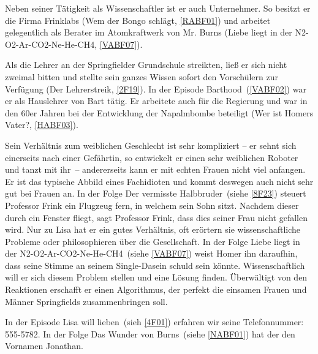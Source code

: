 {Neben seiner Tätigkeit als Wissenschaftler ist er auch Unternehmer. So besitzt er die Firma Frink\-labs (\glqq Wem der Bongo schlägt\grqq , \ref{RABF01}) und arbeitet gelegentlich als Berater im Atomkraftwerk von Mr. Burns (\glqq Liebe liegt in der N2-O2-Ar-CO2-Ne-He-CH4\grqq , \ref{VABF07}).

Als die Lehrer an der Springfielder Grundschule streikten, ließ er sich nicht zweimal bitten und stellte sein ganzes Wissen sofort den Vorschülern zur Verfügung (\glqq Der Lehrerstreik\grqq , \ref{2F19}). In der Episode \glqq Barthood\grqq\ (\ref{VABF02}) war er als Hauslehrer von Bart tätig. Er arbeitete auch für die Regierung und war in den 60er Jahren bei der Entwicklung der Napalmbombe beteiligt (\glqq Wer ist Homers Vater?\grqq, \ref{HABF03}).

Sein Verhältnis zum weiblichen Geschlecht ist sehr kompliziert -- er sehnt sich einerseits nach einer Gefährtin, so entwickelt er einen sehr weiblichen Roboter und tanzt mit \glqq ihr\grqq\ -- andererseits kann er mit echten Frauen nicht viel anfangen. Er ist das typische Abbild eines Fachidioten und kommt deswegen auch nicht sehr gut bei Frauen an. In der Folge \glqq Der vermisste Halbbruder\grqq\ (siehe \ref{8F23}) steuert Professor Frink ein Flugzeug fern, in welchem sein Sohn sitzt. Nachdem dieser durch ein Fenster fliegt, sagt Professor Frink, dass dies seiner Frau nicht gefallen wird. Nur zu Lisa hat er ein gutes Verhältnis, oft erörtern sie wissenschaftliche Probleme oder philosophieren über die Gesellschaft. In der Folge \glqq Liebe liegt in der N2-O2-Ar-CO2-Ne-He-CH4\grqq\ (siehe \ref{VABF07}) weist Homer ihn daraufhin, dass seine Stimme an seinem Single-Dasein schuld sein könnte. Wissenschaftlich will er sich diesem Problem stellen und eine Lösung finden. Überwältigt von den Reaktionen erschafft er einen Algorithmus, der perfekt die einsamen Frauen und Männer Springfields zusammenbringen soll.

In der Episode \glqq Lisa will lieben\grqq\ (sieh \ref{4F01}) erfahren wir seine Telefonnummer: 555-5782. In der Folge \glqq Das Wunder von Burns\grqq\ (siehe \ref{NABF01}) hat der den Vornamen Jonathan.


}
